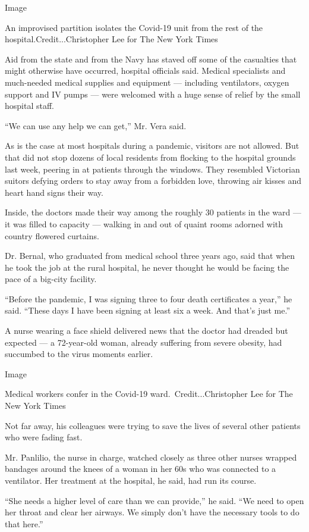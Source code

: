 Image

An improvised partition isolates the Covid-19 unit from the rest of the
hospital.Credit...Christopher Lee for The New York Times

Aid from the state and from the Navy has staved off some of the
casualties that might otherwise have occurred, hospital officials said.
Medical specialists and much-needed medical supplies and equipment ---
including ventilators, oxygen support and IV pumps --- were welcomed
with a huge sense of relief by the small hospital staff.

``We can use any help we can get,'' Mr. Vera said.

As is the case at most hospitals during a pandemic, visitors are not
allowed. But that did not stop dozens of local residents from flocking
to the hospital grounds last week, peering in at patients through the
windows. They resembled Victorian suitors defying orders to stay away
from a forbidden love, throwing air kisses and heart hand signs their
way.

Inside, the doctors made their way among the roughly 30 patients in the
ward --- it was filled to capacity --- walking in and out of quaint
rooms adorned with country flowered curtains.

Dr. Bernal, who graduated from medical school three years ago, said that
when he took the job at the rural hospital, he never thought he would be
facing the pace of a big-city facility.

``Before the pandemic, I was signing three to four death certificates a
year,'' he said. ``These days I have been signing at least six a week.
And that's just me.''

A nurse wearing a face shield delivered news that the doctor had dreaded
but expected --- a 72-year-old woman, already suffering from severe
obesity, had succumbed to the virus moments earlier.

Image

Medical workers confer in the Covid-19 ward.~Credit...Christopher Lee
for The New York Times

Not far away, his colleagues were trying to save the lives of several
other patients who were fading fast.

Mr. Panlilio, the nurse in charge, watched closely as three other nurses
wrapped bandages around the knees of a woman in her 60s who was
connected to a ventilator. Her treatment at the hospital, he said, had
run its course.

``She needs a higher level of care than we can provide,'' he said. ``We
need to open her throat and clear her airways. We simply don't have the
necessary tools to do that here.''

